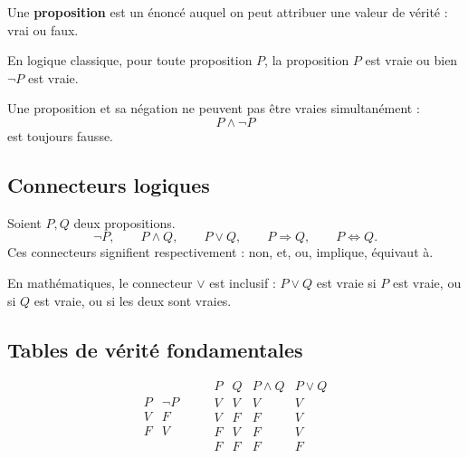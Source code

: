 \documentclass[11pt,a4paper]{article}
\newcommand{\non}{\neg}
\newcommand{\et}{\wedge}
\newcommand{\ou}{\vee}
\newcommand{\imp}{\Rightarrow}
\newcommand{\ssi}{\Longleftrightarrow}
\begin{document}
\begin{definitionbox}[proposition]
Une \textbf{proposition} est un énoncé auquel on peut attribuer une valeur de vérité : vrai ou faux.
\end{definitionbox}

\begin{definitionbox}
En logique classique, pour toute proposition \(P\), la proposition \(P\) est vraie ou bien \(\non P\) est vraie.
\end{definitionbox}

\begin{definitionbox}
Une proposition et sa négation ne peuvent pas être vraies simultanément :
\[
P\et\non P
\]
est toujours fausse.
\end{definitionbox}

\subsection{Connecteurs logiques}

\begin{definitionbox}[connecteurs]
Soient \(P,Q\) deux propositions.
\[
\non P,\qquad P\et Q,\qquad P\ou Q,\qquad P\imp Q,\qquad P\ssi Q.
\]
Ces connecteurs signifient respectivement : non, et, ou, implique, équivaut à.
\end{definitionbox}

\begin{remarquebox}[ou inclusif]
En mathématiques, le connecteur \(\ou\) est inclusif : \(P\ou Q\) est vraie si \(P\) est vraie, ou si \(Q\) est vraie, ou si les deux sont vraies.
\end{remarquebox}

\subsection{Tables de vérité fondamentales}

\begin{center}
\[
\begin{array}{c|c}
P & \non P\\
\hline
V&F\\
F&V
\end{array}
\qquad
\begin{array}{c|c|c|c}
P&Q&P\et Q&P\ou Q\\
\hline
V&V&V&V\\
V&F&F&V\\
F&V&F&V\\
F&F&F&F
\end{array}
\]
\end{center}
\end{document}
